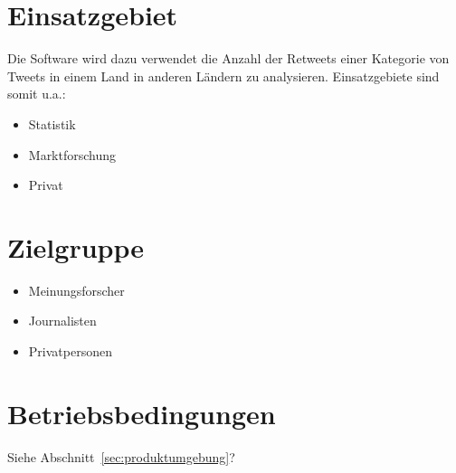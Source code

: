 \section{Einsatzgebiet}
Die Software wird dazu verwendet die Anzahl der Retweets einer Kategorie von Tweets in einem Land in anderen Ländern zu analysieren. Einsatzgebiete sind somit u.a.:
\begin{itemize}
	\item Statistik
	\item Marktforschung
	\item Privat
\end{itemize}
\section{Zielgruppe}
\begin{itemize}
	\item Meinungsforscher
	\item Journalisten
	\item Privatpersonen
\end{itemize}
\section{Betriebsbedingungen}
Siehe  Abschnitt~\ref{sec:produktumgebung}?
